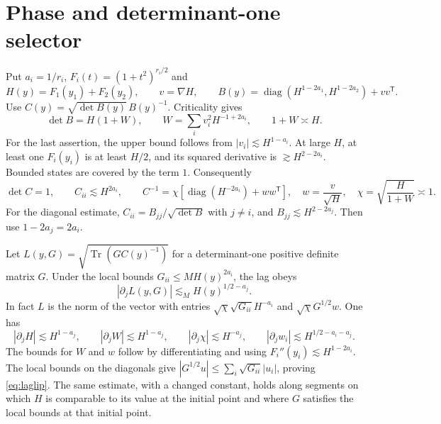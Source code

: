 \documentclass[11pt]{article}
\begin{document}
\section{Phase and determinant-one selector}

Put \(a_i=1/r_i\), \(F_i(t)=(1+t^2)^{r_i/2}\) and
\[
 H(y)=F_1(y_1)+F_2(y_2),\qquad v=\nabla H,\qquad
 B(y)=\operatorname{diag}(H^{1-2a_1},H^{1-2a_2})+vv^{\mathsf T}.
\]
Use \(C(y)=\sqrt{\det B(y)}\,B(y)^{-1}\).
Criticality gives
\[
 \det B=H(1+W),\qquad W=\sum_i v_i^2 H^{-1+2a_i},
 \qquad 1+W\asymp H .
\]
For the last assertion, the upper bound follows from
\(|v_i|\lesssim H^{1-a_i}\). At large \(H\), at least one
\(F_i(y_i)\) is at least \(H/2\), and its squared derivative
is \(\gtrsim H^{2-2a_i}\). Bounded states are covered by the term
\(1\). Consequently
\begin{equation}\label{eq:metric}
 \det C=1,\qquad C_{ii}\lesssim H^{2a_i},\qquad
 C^{-1}=\chi\left[\operatorname{diag}(H^{-2a_i})+ww^{\mathsf T}\right],
 \quad w=\frac{v}{\sqrt H},\quad \chi=\sqrt{\frac{H}{1+W}}\asymp1 .
\end{equation}
For the diagonal estimate, \(C_{ii}=B_{jj}/\sqrt{\det B}\) with
\(j\ne i\), and \(B_{jj}\lesssim H^{2-2a_j}\). Then use
\(1-2a_j=2a_i\).

Let \(L(y,G)=\sqrt{\operatorname{Tr}(G C(y)^{-1})}\) for a
determinant-one positive definite matrix \(G\).
Under the local bounds \(G_{ii}\le M H(y)^{2a_i}\), the lag obeys
\begin{equation}\label{eq:laglip}
 |\partial_j L(y,G)|\lesssim_M H(y)^{1/2-a_j}.
\end{equation}
In fact \(L\) is the norm of the vector with entries
\(\sqrt\chi \sqrt{G_{ii}} H^{-a_i}\) and
\(\sqrt\chi G^{1/2}w\).
One has
\[
 |\partial_j H|\lesssim H^{1-a_j},\qquad
 |\partial_j W|\lesssim H^{1-a_j},\qquad
 |\partial_j \chi|\lesssim H^{-a_j},\qquad
 |\partial_j w_i|\lesssim H^{1/2-a_i-a_j}.
\]
The bounds for \(W\) and \(w\) follow by differentiating and using
\(F_i''(y_i)\lesssim H^{1-2a_i}\). The local bounds on the diagonals
give \(|G^{1/2}u|\le\sum_i\sqrt{G_{ii}}|u_i|\), proving
\eqref{eq:laglip}. The same estimate, with a changed constant,
holds along segments on which \(H\) is comparable to its value
at the initial point and where \(G\) satisfies the local bounds
at that initial point.
\end{document}
